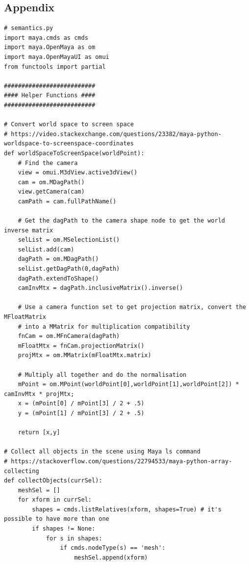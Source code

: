 \documentclass[conference]{IEEEtran}
\begin{document}




\onecolumn

\pagebreak

\begin{center}
\section*{Appendix}
\label{app:b}
\end{center}

\bigskip

\footnotesize{
\begin{verbatim}
# semantics.py
import maya.cmds as cmds
import maya.OpenMaya as om
import maya.OpenMayaUI as omui
from functools import partial

##########################
#### Helper Functions ####
##########################

# Convert world space to screen space
# https://video.stackexchange.com/questions/23382/maya-python-worldspace-to-screenspace-coordinates
def worldSpaceToScreenSpace(worldPoint):
    # Find the camera
    view = omui.M3dView.active3dView()
    cam = om.MDagPath()
    view.getCamera(cam)
    camPath = cam.fullPathName()
    
    # Get the dagPath to the camera shape node to get the world inverse matrix
    selList = om.MSelectionList()
    selList.add(cam)
    dagPath = om.MDagPath()
    selList.getDagPath(0,dagPath)
    dagPath.extendToShape()
    camInvMtx = dagPath.inclusiveMatrix().inverse()

    # Use a camera function set to get projection matrix, convert the MFloatMatrix 
    # into a MMatrix for multiplication compatibility
    fnCam = om.MFnCamera(dagPath)
    mFloatMtx = fnCam.projectionMatrix()
    projMtx = om.MMatrix(mFloatMtx.matrix)

    # Multiply all together and do the normalisation
    mPoint = om.MPoint(worldPoint[0],worldPoint[1],worldPoint[2]) * camInvMtx * projMtx;
    x = (mPoint[0] / mPoint[3] / 2 + .5)
    y = (mPoint[1] / mPoint[3] / 2 + .5)

    return [x,y]

# Collect all objects in the scene using Maya ls command
# https://stackoverflow.com/questions/22794533/maya-python-array-collecting
def collectObjects(currSel):
    meshSel = []
    for xform in currSel:
        shapes = cmds.listRelatives(xform, shapes=True) # it's possible to have more than one
        if shapes != None:
            for s in shapes:
                if cmds.nodeType(s) == 'mesh':
                    meshSel.append(xform)
  

\end{verbatim}}
\end{document}
